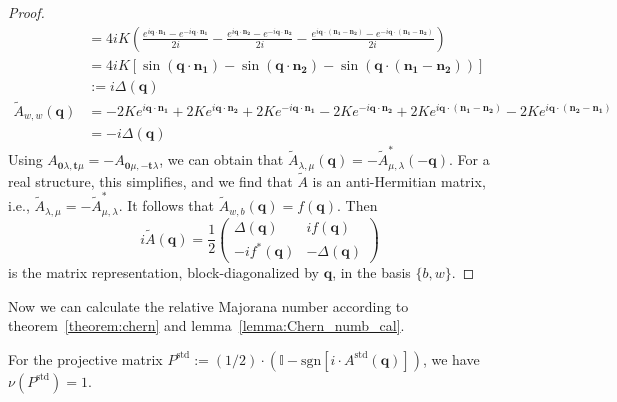 \begin{proof}
\begin{align*}
&= 4iK \left( \frac{e^{i \mathbf q \cdot \mathbf{n_1}} - e^{-i \mathbf q \cdot \mathbf{n_1}}}{2i} - \frac{e^{i \mathbf q \cdot \mathbf{n_2}} - e^{-i \mathbf q \cdot \mathbf{n_2}}}{2i} - \frac{e^{i \mathbf q \cdot (\mathbf{n_1}-\mathbf{n_2})} - e^{-i \mathbf q \cdot (\mathbf{n_1}-\mathbf{n_2})}}{2i} \right) \\
&= 4iK \left[\sin(\mathbf q \cdot\mathbf{n_1}) - \sin(\mathbf q \cdot\mathbf{n_2}) - \sin(\mathbf q \cdot (\mathbf{n_1} - \mathbf{n_2}))\right] \\
&:= i\Delta(\mathbf{q}) \\
\tilde A_{w,w}(\mathbf{q}) &= -2Ke^{i \mathbf q \cdot \mathbf{n_1}} + 2K e^{i \mathbf q \cdot \mathbf{n_2}} + 2K e^{-i \mathbf q \cdot \mathbf{n_1}} - 2K e^{-i \mathbf q \cdot \mathbf{n_2}} + 2K e^{i \mathbf q \cdot (\mathbf{n_1} - \mathbf{n_2})} - 2K e^{i \mathbf q \cdot (\mathbf{n_2} - \mathbf{n_1})} \\
&= -i\Delta(\mathbf{q})
\end{align*}
Using $A_{\mathbf0\lambda, \mathbf t\mu} = -A_{\mathbf 0\mu,-\mathbf t\lambda}$, we can obtain that $\tilde A_{\lambda,\mu}(\mathbf{q}) = -\tilde A_{\mu,\lambda}^*(-\mathbf{q})$. For a real structure, this simplifies, and we find that $\tilde A$ is an anti-Hermitian matrix, i.e., $\tilde A_{\lambda,\mu} = -\tilde A_{\mu,\lambda}^*$. It follows that $\tilde A_{w,b}(\mathbf{q})=f(\mathbf{q})$.
Then
$$
i\tilde A(\mathbf{q}) =\frac{1}{2}\begin{pmatrix}\Delta(\mathbf{q})&if(\mathbf{q}) \\ -if^*(\mathbf{q})&-\Delta(\mathbf{q})\end{pmatrix}
$$
is the matrix representation, block-diagonalized by $\mathbf{q}$, in the basis $\{b,w\}$.
\end{proof}

Now we can calculate the relative Majorana number according to theorem~\ref{theorem:chern} and lemma~\ref{lemma:Chern_numb_cal}. 
\begin{lemma}\label{lemma:cal_honeycomb_Chern}
    For the projective matrix $P^{\mathrm{std}}:=(1/2)\cdot \left(\mathbb{I}-\text{sgn}\left[i\cdot A^{\mathrm{std}}(\mathbf{q})\right]\right)$, we have $\nu(P^{\mathrm{std}}) = 1$.
\end{lemma}

